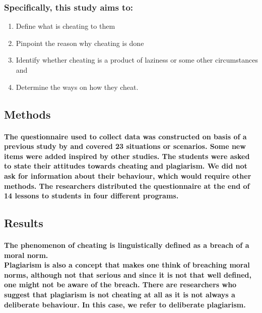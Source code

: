 \documentclass{article}
\begin{document}
	   \subsubsection{Specifically, this study aims to:}
	   \begin{enumerate}
	   	
	   \item Define what is cheating to them
	   \item Pinpoint the reason why cheating is done
	   \item Identify whether cheating is a product of laziness or some other circumstances and 
	   \item Determine the ways on how they cheat.
	   	
	   \end{enumerate}
	  
	   
	   
	   \subsection{Methods}
	   \paragraph{The questionnaire used to collect data was constructed on basis of a previous study by \cite{DUMMY:1} and covered 23 situations or scenarios. Some new items were added inspired by other studies. The students were asked to state their attitudes towards cheating and plagiarism. We did not ask for information about their behaviour, which would require other methods. The researchers distributed the questionnaire at the end of 14 lessons to students in four different programs.}
	   
	   \subsection{Results}
	   \paragraph{The phenomenon of cheating is linguistically defined as a breach of a moral norm.\\ Plagiarism is also a concept that makes one think of breaching moral norms, although not that serious and since it is not that well defined, one might not be aware of the breach. There are researchers who suggest that plagiarism is not cheating at all as it is not always a deliberate behaviour. In this case, we refer to deliberate plagiarism.}
	   
\end{document}
